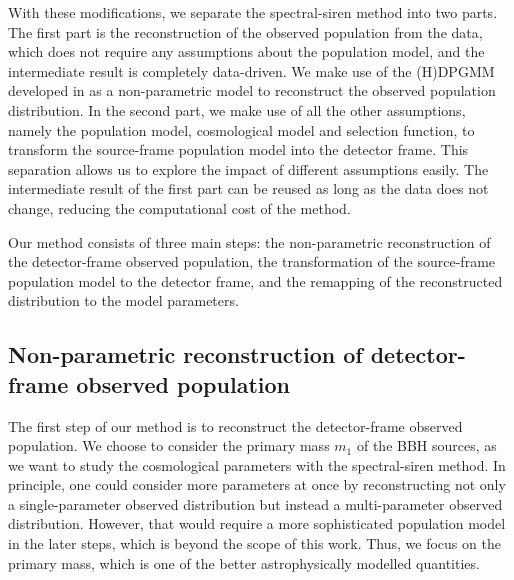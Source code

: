 \documentclass[sn-aps, pdflatex, iicol]{sn-jnl}
\begin{document}
With these modifications, we separate the spectral-siren method into two parts.
The first part is the reconstruction of the observed population from the data, which does not require any assumptions about the population model, and the intermediate result is completely data-driven.
We make use of the \ac{(H)DPGMM} developed in \cite{Rinaldi:2021bhm} as a non-parametric model to reconstruct the observed population distribution.
In the second part, we make use of all the other assumptions, namely the population model, cosmological model and selection function, to transform the source-frame population model into the detector frame.
This separation allows us to explore the impact of different assumptions easily.
The intermediate result of the first part can be reused as long as the data does not change, reducing the computational cost of the method.

Our method consists of three main steps: the non-parametric reconstruction of the detector-frame observed population, the transformation of the source-frame population model to the detector frame, and the remapping of the reconstructed distribution to the model parameters.

\subsection{Non-parametric reconstruction of detector-frame observed population}
\label{sec:reconstruction}

The first step of our method is to reconstruct the detector-frame observed population.
We choose to consider the primary mass $m_1$ of the \ac{BBH} sources, as we want to study the cosmological parameters with the spectral-siren method.
In principle, one could consider more parameters at once by reconstructing not only a single-parameter observed distribution but instead a multi-parameter observed distribution.
However, that would require a more sophisticated population model in the later steps, which is beyond the scope of this work.
Thus, we focus on the primary mass, which is one of the better astrophysically modelled quantities.
\end{document}
